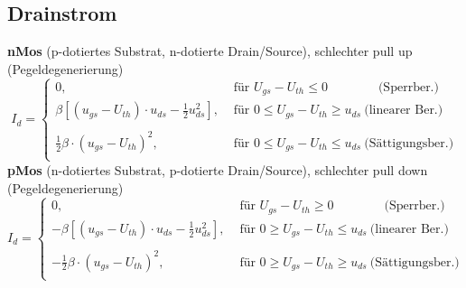 \documentclass[6pt,a4paper]{scrartcl}
\begin{document}
\begin{multicols*}{3}
	\subsection{Drainstrom}
		\textbf{nMos} (p-dotiertes Substrat, n-dotierte Drain/Source), schlechter pull up (Pegeldegenerierung)
		\begin{equation*}
		\!\!\! I_d = \begin{cases}
		0, &\text{ für }  U_{gs} - U_{th} \le 0 \qquad \qquad  \text{(Sperrber.)}\\[0.2em]
		 \beta [(u_{gs} - U_{th}) \cdot u_{ds} - \frac{1}{2} u_{ds}^2] , &\text{ für }  0 \le U_{gs} - U_{th} \ge u_{ds} \  \text{(linearer Ber.)}\\\\[0.2em]
		 \frac{1}{2} \beta \cdot (u_{gs} - U_{th})^2, &\text{ für }  0 \le U_{gs} - U_{th} \le u_{ds} \  \text{(Sättigungsber.)}\\
		\end{cases}
		\end{equation*}
		\textbf{pMos} (n-dotiertes Substrat, p-dotierte Drain/Source), schlechter pull down (Pegeldegenerierung)
		\begin{equation*}
		\!\!\! I_d = \begin{cases}
		0, &\text{ für }  U_{gs} - U_{th} \ge 0 \qquad \qquad  \text{(Sperrber.)}\\[0.2em]
		- \beta [(u_{gs} - U_{th}) \cdot u_{ds} - \frac{1}{2} u_{ds}^2] , &\text{ für }  0 \ge U_{gs} - U_{th} \le u_{ds} \  \text{(linearer Ber.)}\\\\[0.2em]
		- \frac{1}{2} \beta \cdot (u_{gs} - U_{th})^2, &\text{ für }  0 \ge U_{gs} - U_{th} \ge u_{ds} \  \text{(Sättigungsber.)}\\
	
		\end{cases}
		\end{equation*}

	

\end{multicols*}
\end{document}
